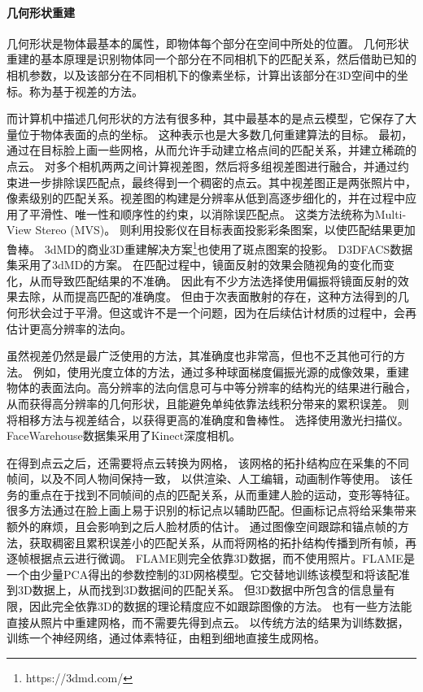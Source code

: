 \paragraph{几何形状重建}
几何形状是物体最基本的属性，即物体每个部分在空间中所处的位置。
几何形状重建的基本原理是识别物体同一个部分在不同相机下的匹配关系，然后借助已知的相机参数，以及该部分在不同相机下的像素坐标，计算出该部分在3D空间中的坐标。称为基于视差的方法。

而计算机中描述几何形状的方法有很多种，其中最基本的是点云模型，它保存了大量位于物体表面的点的坐标。
这种表示也是大多数几何重建算法的目标。
最初，\citet{PFM}通过在目标脸上画一些网格，从而允许手动建立格点间的匹配关系，并建立稀疏的点云。
\citet{ss_geo}对多个相机两两之间计算视差图，然后将多组视差图进行融合，并通过约束进一步排除误匹配点，最终得到一个稠密的点云。其中视差图正是两张照片中，像素级别的匹配关系。视差图的构建是分辨率从低到高逐步细化的，并在过程中应用了平滑性、唯一性和顺序性的约束，以消除误匹配点。
这类方法统称为Multi-View Stereo (MVS)。
\citet{DEP}则利用投影仪在目标表面投影彩条图案，以使匹配结果更加鲁棒。
3dMD的商业3D重建解决方案\footnote{https://3dmd.com/}也使用了斑点图案的投影。
D3DFACS\citep{D3DFACS}数据集采用了3dMD的方案。
在匹配过程中，镜面反射的效果会随视角的变化而变化，从而导致匹配结果的不准确。
因此有不少方法\citep{DEP}选择使用偏振将镜面反射的效果去除，从而提高匹配的准确度。
但由于次表面散射的存在，这种方法得到的几何形状会过于平滑。但这或许不是一个问题，因为在后续估计材质的过程中，会再估计更高分辨率的法向。

虽然视差仍然是最广泛使用的方法，其准确度也非常高，但也不乏其他可行的方法。
例如，\citet{MaHPCWD07}使用光度立体的方法，通过多种球面梯度偏振光源的成像效果，重建物体的表面法向。高分辨率的法向信息可与中等分辨率的结构光的结果进行融合，从而获得高分辨率的几何形状，且能避免单纯依靠法线积分带来的累积误差。
\citet{phase_shift}则将相移方法与视差结合，以获得更高的准确度和鲁棒性。
\citet{BJUT3D}选择使用激光扫描仪。
FaceWarehouse\citep{FaceWarehouse}数据集采用了Kinect深度相机。

在得到点云之后，还需要将点云转换为网格，
该网格的拓扑结构应在采集的不同帧间，以及不同人物间保持一致，
以供渲染、人工编辑，动画制作等使用。
该任务的重点在于找到不同帧间的点的匹配关系，从而重建人脸的运动，变形等特征。
很多方法\citep{PFM,DEP,BickelBAMOPG07}通过在脸上画上易于识别的标记点以辅助匹配。但画标记点将给采集带来额外的麻烦，且会影响到之后人脸材质的估计。
\citet{BeelerHBBBGSG11}通过图像空间跟踪和锚点帧的方法，获取稠密且累积误差小的匹配关系，从而将网格的拓扑结构传播到所有帧，再逐帧根据点云进行微调。
FLAME\citep{FLAME}则完全依靠3D数据，而不使用照片。FLAME是一个由少量PCA得出的参数控制的3D网格模型。它交替地训练该模型和将该配准到3D数据上，从而找到3D数据间的匹配关系。
但3D数据中所包含的信息量有限，因此完全依靠3D的数据的理论精度应不如跟踪图像的方法。
也有一些方法能直接从照片中重建网格，而不需要先得到点云。
\citet{LiLBL0Z21}以传统方法的结果为训练数据，训练一个神经网络，通过体素特征，由粗到细地直接生成网格。

